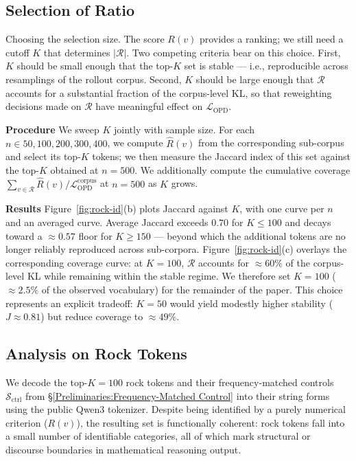 \subsection{Selection of Ratio}
Choosing the selection size. The score $R(v)$ provides a ranking; we still need a cutoff $K$ that determines $|\mathcal{R}|$. Two competing criteria bear on this choice. First, $K$ should be small enough that the top-$K$ set is stable — i.e., reproducible across resamplings of the rollout corpus. Second, $K$ should be large enough that $\mathcal{R}$ accounts for a substantial fraction of the corpus-level KL, so that reweighting decisions made on $\mathcal{R}$ have meaningful effect on $\mathcal{L}_{\text{OPD}}$.

\textbf{Procedure} We sweep $K$ jointly with sample size. For each $n \in {50, 100, 200, 300, 400}$, we compute $\widehat R(v)$ from the corresponding sub-corpus and select its top-$K$ tokens; we then measure the Jaccard index of this set against the top-$K$ obtained at $n = 500$. We additionally compute the cumulative coverage $\sum_{v \in \mathcal{R}} \widehat R(v) / \mathcal{L}_{\text{OPD}}^{\text{corpus}}$ at $n = 500$ as $K$ grows.

\textbf{Results} Figure~\ref{fig:rock-id}(b) plots Jaccard against $K$, with one curve per $n$ and an averaged curve. Average Jaccard exceeds $0.70$ for $K \leq 100$ and decays toward a $\approx 0.57$ floor for $K \geq 150$ — beyond which the additional tokens are no longer reliably reproduced across sub-corpora. Figure~\ref{fig:rock-id}(c) overlays the corresponding coverage curve: at $K = 100$, $\mathcal{R}$ accounts for $\approx 60\%$ of the corpus-level KL while remaining within the stable regime. We therefore set $K = 100$ ($\approx 2.5\%$ of the observed vocabulary) for the remainder of the paper. This choice represents an explicit tradeoff: $K = 50$ would yield modestly higher stability ($J \approx 0.81$) but reduce coverage to $\approx 49\%$.

\subsection{Analysis on Rock Tokens}
 We decode the top-$K{=}100$ rock tokens and their frequency-matched controls $\mathcal{S}_{\text{ctrl}}$ from §\ref{Preliminaries:Frequency-Matched Control} into their string forms using the public Qwen3 tokenizer. Despite being identified by a purely numerical criterion ($R(v)$), the resulting set is functionally coherent: rock tokens fall into a small number of identifiable categories, all of which mark structural or discourse boundaries in mathematical reasoning output.

